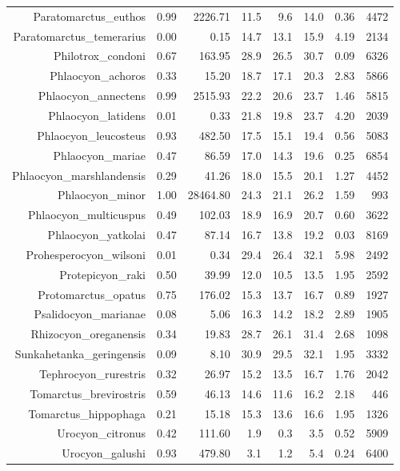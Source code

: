\begin{table}[ht]
\begin{tabular}{rrrrrrrr}
  Paratomarctus\_euthos & 0.99 & 2226.71 & 11.5 & 9.6 & 14.0 & 0.36 & 4472 \\ 
  Paratomarctus\_temerarius & 0.00 & 0.15 & 14.7 & 13.1 & 15.9 & 4.19 & 2134 \\ 
  Philotrox\_condoni & 0.67 & 163.95 & 28.9 & 26.5 & 30.7 & 0.09 & 6326 \\ 
  Phlaocyon\_achoros & 0.33 & 15.20 & 18.7 & 17.1 & 20.3 & 2.83 & 5866 \\ 
  Phlaocyon\_annectens & 0.99 & 2515.93 & 22.2 & 20.6 & 23.7 & 1.46 & 5815 \\ 
  Phlaocyon\_latidens & 0.01 & 0.33 & 21.8 & 19.8 & 23.7 & 4.20 & 2039 \\ 
  Phlaocyon\_leucosteus & 0.93 & 482.50 & 17.5 & 15.1 & 19.4 & 0.56 & 5083 \\ 
  Phlaocyon\_mariae & 0.47 & 86.59 & 17.0 & 14.3 & 19.6 & 0.25 & 6854 \\ 
  Phlaocyon\_marshlandensis & 0.29 & 41.26 & 18.0 & 15.5 & 20.1 & 1.27 & 4452 \\ 
  Phlaocyon\_minor & 1.00 & 28464.80 & 24.3 & 21.1 & 26.2 & 1.59 & 993 \\ 
  Phlaocyon\_multicuspus & 0.49 & 102.03 & 18.9 & 16.9 & 20.7 & 0.60 & 3622 \\ 
  Phlaocyon\_yatkolai & 0.47 & 87.14 & 16.7 & 13.8 & 19.2 & 0.03 & 8169 \\ 
  Prohesperocyon\_wilsoni & 0.01 & 0.34 & 29.4 & 26.4 & 32.1 & 5.98 & 2492 \\ 
  Protepicyon\_raki & 0.50 & 39.99 & 12.0 & 10.5 & 13.5 & 1.95 & 2592 \\ 
  Protomarctus\_opatus & 0.75 & 176.02 & 15.3 & 13.7 & 16.7 & 0.89 & 1927 \\ 
  Psalidocyon\_marianae & 0.08 & 5.06 & 16.3 & 14.2 & 18.2 & 2.89 & 1905 \\ 
  Rhizocyon\_oreganensis & 0.34 & 19.83 & 28.7 & 26.1 & 31.4 & 2.68 & 1098 \\ 
  Sunkahetanka\_geringensis & 0.09 & 8.10 & 30.9 & 29.5 & 32.1 & 1.95 & 3332 \\ 
  Tephrocyon\_rurestris & 0.32 & 26.97 & 15.2 & 13.5 & 16.7 & 1.76 & 2042 \\ 
  Tomarctus\_brevirostris & 0.59 & 46.13 & 14.6 & 11.6 & 16.2 & 2.18 & 446 \\ 
  Tomarctus\_hippophaga & 0.21 & 15.18 & 15.3 & 13.6 & 16.6 & 1.95 & 1326 \\ 
  Urocyon\_citronus & 0.42 & 111.60 & 1.9 & 0.3 & 3.5 & 0.52 & 5909 \\ 
  Urocyon\_galushi & 0.93 & 479.80 & 3.1 & 1.2 & 5.4 & 0.24 & 6400 \\ 

\end{tabular}
\end{table}
